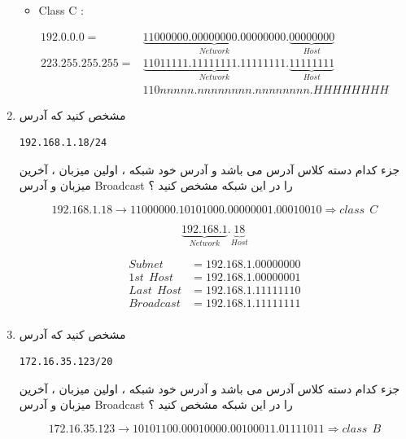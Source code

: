 \documentclass{article}
\begin{document}
\begin{enumerate}
\begin{tcolorbox}
\begin{latin}
\begin{itemize}
	\item Class C :
\end{itemize}
\end{latin}
\begin{align*}
192.  0.  0.  0 = &\underbrace{11000000.00000000.00000000}_{Network}.\underbrace{00000000}_{Host} \\
223.255.255.255 = &\underbrace{11011111.11111111.11111111}_{Network}.\underbrace{11111111}_{Host} \\
                  &110nnnnn.nnnnnnnn.nnnnnnnn.HHHHHHHH
\end{align*}
\end{tcolorbox}

\newpage

\item مشخص کنید که آدرس 
\begin{lstlisting}
192.168.1.18/24
\end{lstlisting}
جزء کدام دسته کلاس آدرس می باشد و آدرس خود شبکه ، اولین میزبان ، آخرین میزبان و آدرس Broadcast را در این شبکه مشخص کنید ؟

\begin{tcolorbox}
$$
192.168.1.18 \to 11000000.10101000.00000001.00010010 \Rightarrow class \:\: C
$$

$$
\underbrace{192.168.1}_{Network}.\underbrace{18}_{Host}
$$


\begin{align*}
Subnet &= 192.168.1.00000000 \\
1st \:\: Host &= 192.168.1.00000001 \\
Last \:\: Host &= 192.168.1.11111110 \\
Broadcast &= 192.168.1.11111111 \\
\end{align*}

\end{tcolorbox}


\item مشخص کنید که آدرس 
\begin{lstlisting}
172.16.35.123/20
\end{lstlisting}
جزء کدام دسته کلاس آدرس می باشد و آدرس خود شبکه ، اولین میزبان ، آخرین میزبان و آدرس Broadcast را در این شبکه مشخص کنید ؟

\begin{tcolorbox}
$$
172.16.35.123 \to 10101100.00010000.00100011.01111011 \Rightarrow class \:\: B
$$



\end{tcolorbox}
\end{enumerate}
\end{document}
